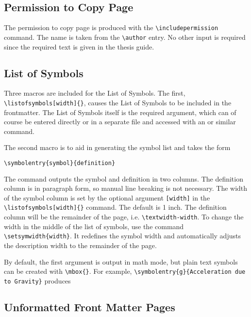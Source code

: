 \documentclass[11pt]{article}
\begin{document}
\begin{singlespace}
\vspace{0.25in}


\subsection*{Permission to Copy Page}

The permission to copy page is produced with the \verb+\includepermission+
command.  The name is taken from the \verb+\author+ entry.  No other input is
required since the required text is given in the thesis guide.

\subsection*{List of Symbols}

Three macros are included for the List of Symbols.  The first,
\verb+\listofsymbols[width]{}+, causes the List of Symbols to be included in the
frontmatter.  The List of Symbols itself is the required argument, which can of
course be entered directly or in a separate file and accessed with an
\verb++ or similar command.  

The second macro is to aid in generating the symbol list and takes the form

\noindent \verb+\symbolentry{symbol}{definition}+  

The command outputs the symbol and definition in two columns.  The definition
column is in paragraph form, so manual line breaking is not necessary.  The
width of the symbol column is set by the optional argument \verb+[width]+ in
the \verb+\listofsymbols[width]{}+ command.  The default is 1 inch.  The
definition column will be the remainder of the page, i.e.
\verb+\textwidth-width+.  To change the width in the middle of the list of
symbols, use the command \verb+\setsymwidth{width}+.  It redefines the symbol
width and automatically adjusts the description width to the remainder of the
page.

By default, the first argument is output in math mode, but plain
text symbols can be created with \verb+\mbox{}+.  For example,
\verb+\symbolentry{g}{Acceleration due to Gravity}+ produces


\subsection*{Unformatted Front Matter Pages}


\end{singlespace}
\end{document}
